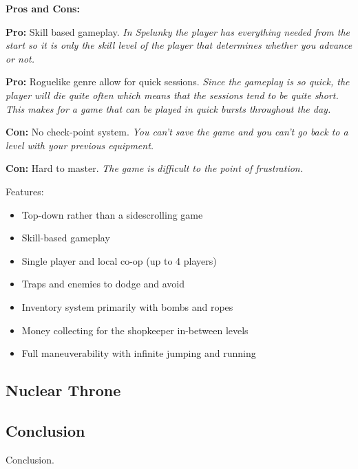 \documentclass[12p]{article}
\begin{document}
\textbf{Pros and Cons:}

\textbf{Pro:} Skill based gameplay. \emph{In Spelunky the player has everything needed from the start so it is only the skill level of the player that determines whether you advance or not.}

\textbf{Pro:} Roguelike genre allow for quick sessions. \emph{Since the gameplay is so quick, the player will die quite often which means that the sessions tend to be quite short. This makes for a game that can be played in quick bursts throughout the day.}

\textbf{Con:} No check-point system. \emph{You can't save the game and you can't go back to a level with your previous equipment.}

\textbf{Con:} Hard to master. \emph{The game is difficult to the point of frustration.}

Features:

\begin{itemize}
    \item Top-down rather than a sidescrolling game
    \item Skill-based gameplay
    \item Single player and local co-op (up to 4 players)
    \item Traps and enemies to dodge and avoid
    \item Inventory system primarily with bombs and ropes
    \item Money collecting for the shopkeeper in-between levels
    \item Full maneuverability with infinite jumping and running
\end{itemize}


\subsection{Nuclear Throne}


\subsection{Conclusion}
Conclusion.

\end{document}
